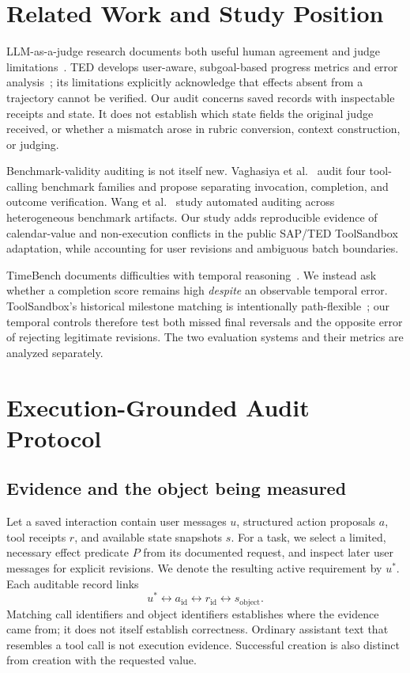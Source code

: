 \documentclass[10pt,letterpaper]{article}
\begin{document}
\section{Related Work and Study Position}
\label{sec:related}
LLM-as-a-judge research documents both useful human agreement and judge limitations~\cite{judge}. TED develops user-aware, subgoal-based progress metrics and error analysis~\cite{ted}; its limitations explicitly acknowledge that effects absent from a trajectory cannot be verified. Our audit concerns saved records with inspectable receipts and state. It does not establish which state fields the original judge received, or whether a mismatch arose in rubric conversion, context construction, or judging.

Benchmark-validity auditing is not itself new. Vaghasiya et al.~\cite{validity} audit four tool-calling benchmark families and propose separating invocation, completion, and outcome verification. Wang et al.~\cite{aba} study automated auditing across heterogeneous benchmark artifacts. Our study adds reproducible evidence of calendar-value and non-execution conflicts in the public SAP/TED ToolSandbox adaptation, while accounting for user revisions and ambiguous batch boundaries.

TimeBench documents difficulties with temporal reasoning~\cite{timebench}. We instead ask whether a completion score remains high \emph{despite} an observable temporal error. ToolSandbox's historical milestone matching is intentionally path-flexible~\cite{toolsandbox}; our temporal controls therefore test both missed final reversals and the opposite error of rejecting legitimate revisions. The two evaluation systems and their metrics are analyzed separately.

\section{Execution-Grounded Audit Protocol}
\label{sec:method}
\subsection{Evidence and the object being measured}
Let a saved interaction contain user messages $u$, structured action proposals $a$, tool receipts $r$, and available state snapshots $s$. For a task, we select a limited, necessary effect predicate $P$ from its documented request, and inspect later user messages for explicit revisions. We denote the resulting active requirement by $u^*$. Each auditable record links
\begin{equation}
 u^* \longleftrightarrow a_{\mathrm{id}}
 \longleftrightarrow r_{\mathrm{id}}
 \longleftrightarrow s_{\mathrm{object}} .
\label{eq:chain}
\end{equation}
Matching call identifiers and object identifiers establishes where the evidence came from; it does not itself establish correctness. Ordinary assistant text that resembles a tool call is not execution evidence. Successful creation is also distinct from creation with the requested value.
\end{document}
